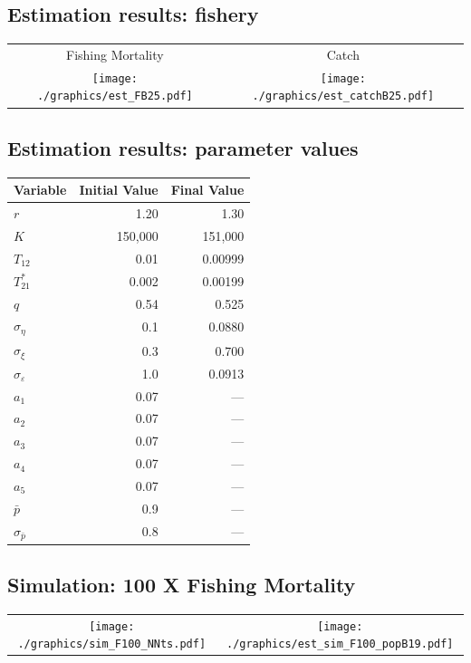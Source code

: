 \documentclass[a4paper,KOMA,landscape,titlepage]{powersem}
\begin{document}
\begin{slide}\section{Estimation results: fishery}
\begin{center}
\begin{tabular}{cc}
{\tiny Fishing Mortality} & {\tiny Catch}\\
\texttt{[image: ./graphics/est\_FB25.pdf]}&
\texttt{[image: ./graphics/est\_catchB25.pdf]}\\
\end{tabular}
\end{center}
\end{slide}

\begin{slide}\section{Estimation results: parameter values}
{\renewcommand{\arraystretch}{0.8}
\begin{center}
\begin{tabular}{lrr}
\hline
Variable & Initial Value & Final Value\\
\hline
$r$ & 1.20&  1.30\\
$K$ & 150,000 & 151,000 \\
$T_{12}$ & 0.01 & 0.00999\\
$T^*_{21}$& 0.002 & 0.00199\\
$q$ & 0.54 & 0.525\\
\hline
$\sigma_\eta$ & 0.1 & 0.0880\\
$\sigma_\xi$ & 0.3 & 0.700\\
$\sigma_\varepsilon$ & 1.0 & 0.0913\\
$a_1$ & 0.07 & ---\\
$a_2$ & 0.07 & ---\\
$a_3$ & 0.07 & ---\\
$a_4$ & 0.07 & ---\\
$a_5$ & 0.07 & ---\\
\hline
$\bar{p}$ & 0.9 & ---\\
$\sigma_{\bar{p}}$ & 0.8 & ---\\
\hline
\end{tabular}
\end{center}
}
\end{slide}

\begin{slide}\section{Simulation: 100 X Fishing Mortality}
\begin{center}
\begin{tabular}{cc}
\texttt{[image: ./graphics/sim\_F100\_NNts.pdf]}&
\texttt{[image: ./graphics/est\_sim\_F100\_popB19.pdf]}
\end{tabular}
\end{center}
\end{slide}
\end{document}

